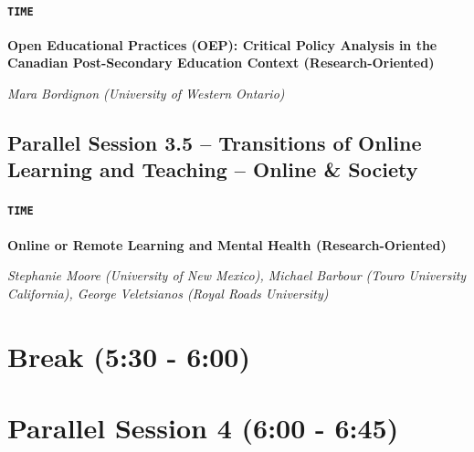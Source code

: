 \documentclass[
]{book}
\begin{document}
\begin{secondary}
\hypertarget{time}{%
\paragraph{\texorpdfstring{\texttt{TIME}}{TIME}}\label{time}}

\textbf{Open Educational Practices (OEP): Critical Policy Analysis in
the Canadian Post-Secondary Education Context (Research-Oriented)}

\emph{Mara Bordignon (University of Western Ontario)}
\end{secondary}

\hypertarget{parallel-session-3.5-transitions-of-online-learning-and-teaching-online-society}{%
\subsection*{Parallel Session 3.5 -- Transitions of Online Learning and Teaching -- Online \& Society}\label{parallel-session-3.5-transitions-of-online-learning-and-teaching-online-society}}

\begin{secondary}
\hypertarget{time}{%
\paragraph{\texorpdfstring{\texttt{TIME}}{TIME}}\label{time}}

\textbf{Online or Remote Learning and Mental Health (Research-Oriented)}

\emph{Stephanie Moore (University of New Mexico), Michael Barbour (Touro
University California), George Veletsianos (Royal Roads University)}
\end{secondary}

\hypertarget{break-530---600}{%
\section*{Break (5:30 - 6:00)}\label{break-530---600}}

\hypertarget{parallel-session-4-600---645}{%
\section*{Parallel Session 4 (6:00 - 6:45)}\label{parallel-session-4-600---645}}
\end{document}
